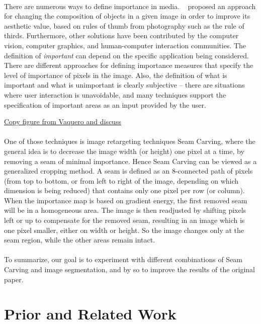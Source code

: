 \documentclass[conference]{acmsiggraph}
\begin{document}
\paragraph{}
There are numerous ways to define importance in media. ~\cite{Liu2010} proposed an approach for changing the composition of objects in a given image in order to improve its aesthetic value, based on rules of thumb from photography such as the rule of thirds. Furthermore, other solutions have been contributed by the computer vision, computer graphics, and human-computer interaction
communities. The definition of \emph{important} can depend on the specific application being considered. There are different approaches for defining importance measures that specify the level of importance of pixels in the image. Also, the definition of what is important and what is unimportant is clearly subjective -- there are situations where user interaction is unavoidable, and many techniques support the specification of important areas as an input provided by the user.

\underline{Copy figure from Vaquero and discuss}

\paragraph{}
One of those techniques is image retargeting techniques Seam Carving, where the general idea is to decrease the image width (or height) one pixel at a time, by removing a seam of minimal importance. Hence Seam Carving can be viewed as a generalized cropping method. A seam is defined as an 8-connected path of pixels (from top to bottom, or from left to right of the image, depending on which dimension is being reduced) that contains only one pixel per row (or column). When the importance map is based on gradient energy, the first removed seam will be in a homogeneous area. The image is then readjusted by shifting pixels left or up to compensate for the removed seam, resulting in an image which is one pixel smaller, either on width or height. So the image changes only at the seam region, while the other areas remain intact. 

\paragraph{}
To summarize, our goal is to experiment with different combinations of Seam Carving and image segmentation, and by so to improve the results of the original paper.


\section{Prior and Related Work}
\end{document}
